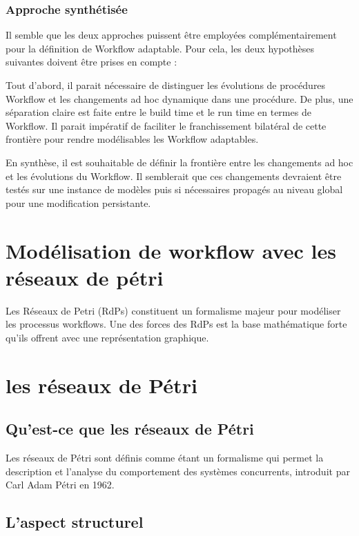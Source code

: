 { 	\subsubsection{ Approche synthétisée}
 	Il semble que les deux approches puissent être employées complémentairement pour la définition de Workflow adaptable. Pour cela, les deux hypothèses suivantes doivent être prises en compte :
 	
 	Tout d’abord, il parait nécessaire de distinguer les évolutions de procédures Workflow et les changements ad hoc dynamique dans une procédure. De plus, une séparation claire est faite entre le build time et le run time en termes de Workflow. Il parait impératif de faciliter le franchissement bilatéral de cette frontière pour rendre modélisables les Workflow adaptables.
 	
 	En synthèse, il est souhaitable de définir la frontière entre les changements ad hoc et les évolutions du Workflow. Il semblerait que ces changements devraient être testés sur une instance de modèles puis si nécessaires propagés au niveau global pour une modification persistante.
 } 
  \section{Modélisation de workflow avec les réseaux de pétri}

Les Réseaux de Petri (RdPs)  constituent un formalisme majeur pour modéliser les processus workflows. Une des forces des RdPs est la base mathématique forte qu'ils offrent avec une représentation graphique. 


\section{les réseaux de Pétri}



\subsection{Qu'est-ce que les réseaux de Pétri }
Les réseaux de Pétri sont définis comme étant un formalisme qui permet la description et l'analyse du comportement des systèmes concurrents, introduit par Carl Adam Pétri en 1962. \parencite{Rdp}

\subsection{L'aspect structurel}

